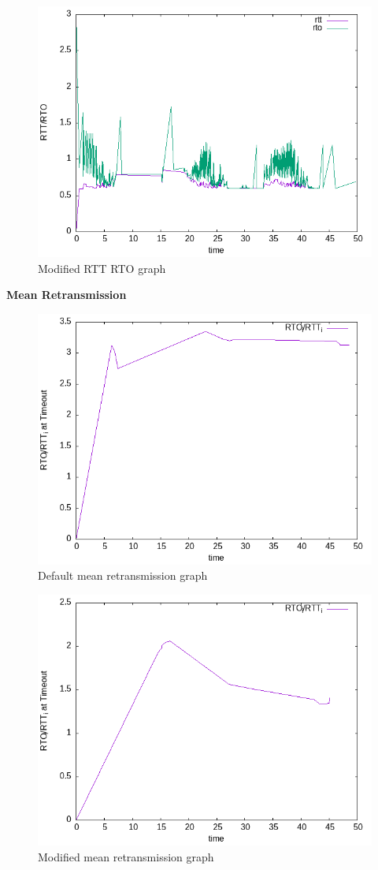 \documentclass{article}[12pt]
\begin{document}
    \begin{figure}[H]
	\centering
	\includegraphics[height=.6\textwidth]{Pictures/rtt/130/m/rtt_rto_graph.png}
	\caption{Modified RTT RTO graph}
\end{figure}   

\newpage
\textbf{Mean Retransmission}
 \begin{figure}[H]
	\centering
	\includegraphics[height=0.6\textwidth]{Pictures/rtt/130/b/mean_retransmission.png}
	\caption{Default mean retransmission graph}
\end{figure}   

\begin{figure}[H]
	\centering
	\includegraphics[height=.6\textwidth]{Pictures/rtt/130/m/mean_retransmission.png}
	\caption{Modified mean retransmission graph}
\end{figure}   
\end{document}
